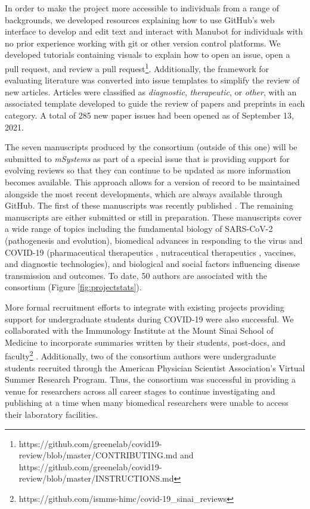 \documentclass[twocolumn]{ceurart}
\begin{document}
In order to make the project more accessible to individuals from a range of backgrounds, we developed resources explaining how to use GitHub's web interface to develop and edit text and interact with Manubot for individuals with no prior experience working with git or other version control platforms.
We developed tutorials containing visuals to explain how to open an issue, open a pull request, and review a pull request\footnote{https://github.com/greenelab/covid19-review/blob/master/CONTRIBUTING.md and https://github.com/greenelab/covid19-review/blob/master/INSTRUCTIONS.md}.
Additionally, the framework for evaluating literature was converted into issue templates to simplify the review of new articles.
Articles were classified as \emph{diagnostic}, \emph{therapeutic}, or \emph{other}, with an associated template developed to guide the review of papers and preprints in each category.
A total of 285 new paper issues had been opened as of September 13, 2021.

The seven manuscripts produced by the consortium (outside of this one) will be submitted to \emph{mSystems} as part of a special issue that is providing support for evolving reviews so that they can continue to be updated as more information becomes available.
This approach allows for a version of record to be maintained alongside the most recent developments, which are always available through GitHub.
The first of these manuscripts was recently published \citep{wgAGKcBj}.
The remaining manuscripts are either submitted or still in preparation.
These manuscripts cover a wide range of topics including the fundamental biology of SARS-CoV-2 (pathogenesis \citep{r366f5T3} and evolution), biomedical advances in responding to the virus and COVID-19 (pharmaceutical therapeutics \citep{cifK9B8t}, nutraceutical therapeutics \citep{wgAGKcBj}, vaccines, and diagnostic technologies), and biological and social factors influencing disease transmission and outcomes.
To date, 50 authors are associated with the consortium (Figure \ref{fig:projectstats}).

More formal recruitment efforts to integrate with existing projects providing support for undergraduate students during COVID-19 were also successful.
We collaborated with the Immunology Institute at the Mount Sinai School of Medicine to incorporate summaries written by their students, post-docs, and faculty\footnote{https://github.com/ismms-himc/covid-19\_sinai\_reviews} \citep{YZ4cHNuH}.
Additionally, two of the consortium authors were undergraduate students recruited through the American Physician Scientist Association's Virtual Summer Research Program.
Thus, the consortium was successful in providing a venue for researchers across all career stages to continue investigating and publishing at a time when many biomedical researchers were unable to access their laboratory facilities.
\end{document}
